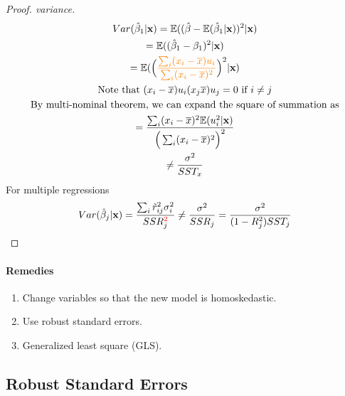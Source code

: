 \documentclass[]{article}
\begin{document}
		\begin{proof}[Proof. variance]
			\begin{gather}
				Var(\hat{\beta}_1 | \textbf{x}) = \mathbb{E}({(\hat{\beta} - \mathbb{E}({\hat{\beta}_1 | \textbf{x}}))^2 | \textbf{x}}) \\
				= \mathbb{E}({(\hat{\beta}_1 - \beta_1)^2 | \textbf{x}}) \\
				= \mathbb{E}({\Big(\textcolor{orange}{\frac{\sum_i (x_i - \overline{x})u_i}{\sum_i (x_i - \overline{x})^2}}\Big)^2|\textbf{x}}) \\
				\text{{Note that }} (x_i - \overline{x})u_i (x_j \overline{x})u_j = 0 \text{{ if }} i \neq j \\
				\text{{By multi-nominal theorem, we can expand the square of summation as}} \\
				= \frac{\sum_i(x_i - \overline{x})^2 \mathbb{E}({u_i^2 | \textbf{x}})}{\Big( \sum_i (x_i - \overline{x})^2 \Big)^2} \\
				\neq \frac{\sigma^2}{SST_x}
			\end{gather}
			For multiple regressions
			\begin{gather}
				Var(\hat{\beta}_j | \textbf{x}) = \frac{\sum_i{\tilde{r}_{ij}^2 \sigma_i^2}}{SSR_j^{\textcolor{red}{2}}} \neq \frac{\sigma^2}{SSR_j} = \frac{\sigma^2}{(1-R^2_j)SST_j}
			\end{gather}
		\end{proof}
		
		\paragraph{Remedies}
		\begin{enumerate}
			\item Change variables so that the new model is homoskedastic.
			\item Use robust standard errors.
			\item Generalized least square (GLS).
		\end{enumerate}
		
		\subsection{Robust Standard Errors}
\end{document}
